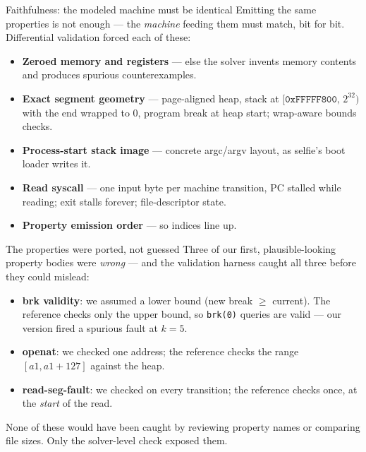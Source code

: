 \documentclass[aspectratio=169]{beamer}
\newcommand{\lab}[1]{{\footnotesize\color{ink!65}#1}}
\newcommand{\key}[1]{\textbf{\color{accentdk}#1}}
\begin{document}
\begin{frame}{Faithfulness: the modeled machine must be identical}
  Emitting the same properties is not enough --- the \emph{machine} feeding
  them must match, bit for bit. Differential validation forced each of these:
  \vspace{0.3em}
  \begin{itemize}\setlength\itemsep{0.3em}\footnotesize
    \item \key{Zeroed memory and registers} --- else the solver invents
          memory contents and produces spurious counterexamples.
    \item \key{Exact segment geometry} --- page-aligned heap, stack at
          $[\texttt{0xFFFFF800},\,2^{32})$ with the end wrapped to 0, program
          break at heap start; wrap-aware bounds checks.
    \item \key{Process-start stack image} --- concrete argc/argv layout, as
          selfie's boot loader writes it.
    \item \key{Read syscall} --- one input byte per machine transition, PC
          stalled while reading; exit stalls forever; file-descriptor state.
    \item \key{Property emission order} --- so indices line up.
  \end{itemize}
\end{frame}

\begin{frame}{The properties were ported, not guessed}
  Three of our first, plausible-looking property bodies were \emph{wrong} ---
  and the validation harness caught all three before they could mislead:
  \vspace{0.3em}
  \begin{itemize}\setlength\itemsep{0.35em}\footnotesize
    \item \key{brk validity}: we assumed a lower bound (new break $\geq$
          current). The reference checks only the upper bound, so
          \texttt{brk(0)} queries are valid --- our version fired a spurious
          fault at $k=5$.
    \item \key{openat}: we checked one address; the reference checks the
          range $[\mathit{a1}, \mathit{a1}+127]$ against the heap.
    \item \key{read-seg-fault}: we checked on every transition; the reference
          checks once, at the \emph{start} of the read.
  \end{itemize}
  \vspace{0.3em}
  \lab{None of these would have been caught by reviewing property names or
       comparing file sizes. Only the solver-level check exposed them.}
\end{frame}
\end{document}
